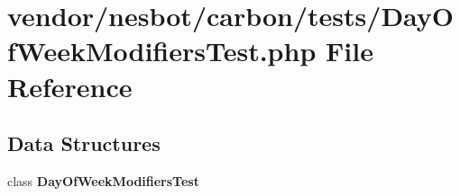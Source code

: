 \section{vendor/nesbot/carbon/tests/\+Day\+Of\+Week\+Modifiers\+Test.php File Reference}
\label{_day_of_week_modifiers_test_8php}
\subsection*{Data Structures}
\begin{DoxyCompactItemize}
\item 
class {\bf Day\+Of\+Week\+Modifiers\+Test}
\end{DoxyCompactItemize}
